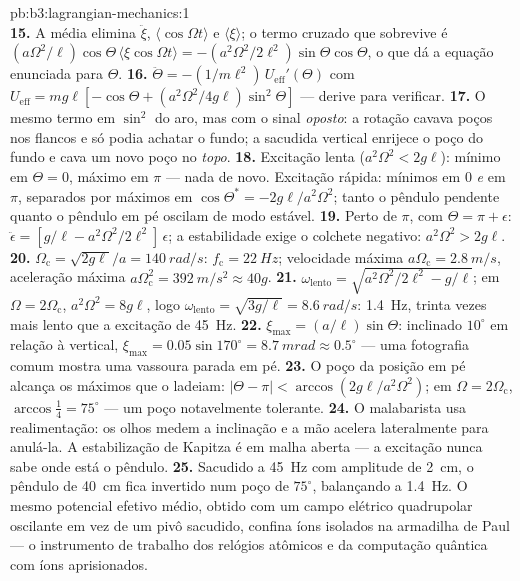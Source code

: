 \begin{solution}{pb:b3:lagrangian-mechanics:1}
\[\]
\textbf{15.} A média elimina $\ddot\xi$, $\langle\cos\Omega t\rangle$
e $\langle\xi\rangle$; o termo cruzado que sobrevive é
$(a\Omega^2/\ell)\cos\Theta\,\langle\xi\cos\Omega t\rangle =
-(a^2\Omega^2/2\ell^2)\sin\Theta\cos\Theta$, o que dá a equação
enunciada para $\Theta$.
\textbf{16.} $\ddot\Theta = -(1/m\ell^2)\,U_{\text{eff}}'(\Theta)$ com
$U_{\text{eff}} = mg\ell[-\cos\Theta + (a^2\Omega^2/4g\ell)
\sin^2\Theta]$ --- derive para verificar.
\textbf{17.} O mesmo termo em $\sin^2$ do aro, mas com o sinal
\emph{oposto}: a rotação cavava poços nos flancos e só podia achatar o
fundo; a sacudida vertical enrijece o poço do fundo e cava um novo poço
no \emph{topo}.
\textbf{18.} Excitação lenta ($a^2\Omega^2 < 2g\ell$): mínimo em $\Theta =
0$, máximo em $\pi$ --- nada de novo. Excitação rápida: mínimos em $0$
\emph{e} em $\pi$, separados por máximos em $\cos\Theta^* =
-2g\ell/a^2\Omega^2$; tanto o pêndulo pendente quanto o pêndulo em pé
oscilam de modo estável.
\textbf{19.} Perto de $\pi$, com $\Theta = \pi + \epsilon$:
$\ddot\epsilon = [g/\ell - a^2\Omega^2/2\ell^2]\,\epsilon$; a
estabilidade exige o colchete negativo: $a^2\Omega^2 > 2g\ell$.
\textbf{20.} $\Omega_{\text{c}} = \sqrt{2g\ell}/a = \qty{140}{rad/s}$:
$f_{\text{c}} = \qty{22}{Hz}$; velocidade máxima $a\Omega_{\text{c}} =
\qty{2.8}{m/s}$, aceleração máxima $a\Omega_{\text{c}}^2 =
\qty{392}{m/s^2} \approx 40g$.
\textbf{21.} $\omega_{\text{lento}} = \sqrt{a^2\Omega^2/2\ell^2 -
g/\ell}$; em $\Omega = 2\Omega_{\text{c}}$, $a^2\Omega^2 = 8g\ell$, logo
$\omega_{\text{lento}} = \sqrt{3g/\ell} = \qty{8.6}{rad/s}$:
\qty{1.4}{Hz}, trinta vezes mais lento que a excitação de \qty{45}{Hz}.
\textbf{22.} $\xi_{\max} = (a/\ell)\sin\Theta$: inclinado $10^\circ$ em
relação à vertical, $\xi_{\max} = 0.05\sin170^\circ = \qty{8.7}{mrad}
\approx 0.5^\circ$ --- uma fotografia comum mostra uma vassoura parada
em pé.
\textbf{23.} O poço da posição em pé alcança os máximos que o ladeiam:
$|\Theta - \pi| < \arccos(2g\ell/a^2\Omega^2)$; em $\Omega =
2\Omega_{\text{c}}$, $\arccos\tfrac14 = 75^\circ$ --- um poço
notavelmente tolerante.
\textbf{24.} O malabarista usa realimentação: os olhos medem a
inclinação e a mão acelera lateralmente para anulá-la. A estabilização
de Kapitza é em malha aberta --- a excitação nunca sabe onde está o
pêndulo.
\textbf{25.} Sacudido a \qty{45}{Hz} com amplitude de \qty{2}{cm}, o
pêndulo de \qty{40}{cm} fica invertido num poço de $75^\circ$,
balançando a \qty{1.4}{Hz}. O mesmo potencial efetivo médio, obtido com
um campo elétrico quadrupolar oscilante em vez de um pivô sacudido,
confina íons isolados na armadilha de Paul --- o instrumento de
trabalho dos relógios atômicos e da computação quântica com íons
aprisionados.
\end{solution}
